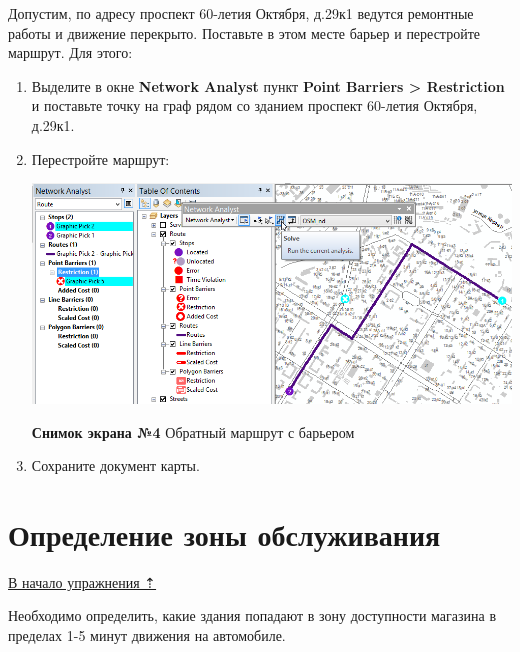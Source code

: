\documentclass[12pt,]{book}
\begin{document}
Допустим, по адресу проспект 60-летия Октября, д.29к1 ведутся ремонтные работы и движение перекрыто. Поставьте в этом месте барьер и перестройте маршрут. Для этого:

\begin{enumerate}
\def\labelenumi{\arabic{enumi}.}
\item
  Выделите в окне \textbf{Network Analyst} пункт \textbf{Point Barriers \textgreater{} Restriction} и поставьте точку на граф рядом со зданием проспект 60-летия Октября, д.29к1.
\item
  Перестройте маршрут:

  \includegraphics{images/Ex12/image13.png}

  \textbf{Снимок экрана №4} Обратный маршрут с барьером
\item
  Сохраните документ карты.
\end{enumerate}

\hypertarget{network-analysis-servicearea}{%
\section{Определение зоны обслуживания}\label{network-analysis-servicearea}}

\protect\hyperlink{network-analysis}{В начало упражнения ⇡}

Необходимо определить, какие здания попадают в зону доступности магазина в пределах 1-5 минут движения на автомобиле.
\end{document}
